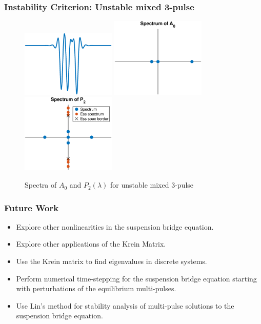 \documentclass[16pt]{beamer}
\begin{document}
\begin{frame}
\frametitle{Instability Criterion: Unstable mixed 3-pulse}
\begin{figure}
\begin{center}
\includegraphics[width=4.5cm]{images/unstable2.eps}
\includegraphics[width=4.5cm]{images/unstable2A0.eps}
\includegraphics[width=4.5cm]{images/unstable2spec.eps}
\caption{Spectra of $A_0$ and $P_2(\lambda)$ for unstable mixed 3-pulse}
\end{center}
\end{figure}
\end{frame}

\begin{frame}
\frametitle{Future Work}
    \begin{itemize}
      \item Explore other nonlinearities in the suspension bridge equation.
      \item Explore other applications of the Krein Matrix.
      \item Use the Krein matrix to find eigenvalues in discrete systems.
      \item Perform numerical time-stepping for the suspension bridge equation starting with perturbations of the equilibrium multi-pulses.
      \item Use Lin's method for stability analysis of multi-pulse solutions to the suspension bridge equation.
    \end{itemize} 
\end{frame}
\end{document}
